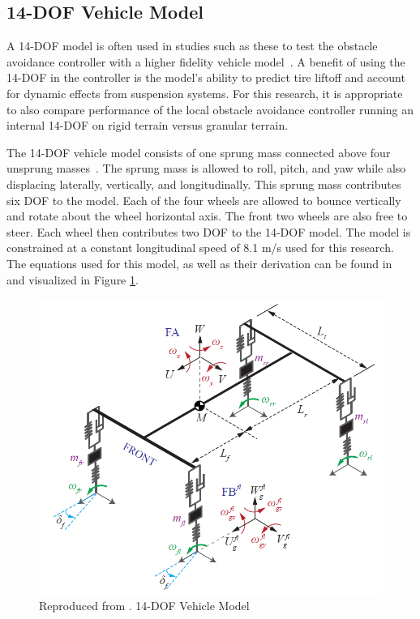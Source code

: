 \documentclass[12pt,onecolumn]{report}
\begin{document}

\subsection{14-DOF Vehicle Model}\label{ss:14DOFModel}
A 14-DOF model is often used in studies such as these to test the obstacle avoidance controller with a higher fidelity vehicle model~\cite{ModelFidelity2013, ModelFidelity2016}. A benefit of using the 14-DOF in the controller is the model's ability to predict tire liftoff and account for dynamic effects from suspension systems. For this research, it is appropriate to also compare performance of the local obstacle avoidance controller running an internal 14-DOF on rigid terrain versus granular terrain.  

The 14-DOF vehicle model consists of one sprung mass connected above four unsprung masses~\cite{RollStudies2007}. The sprung mass is allowed to roll, pitch, and yaw while also displacing laterally, vertically, and longitudinally. This sprung mass contributes six DOF to the model. Each of the four wheels are allowed to bounce vertically and rotate about the wheel horizontal axis. The front two wheels are also free to steer. Each wheel then contributes two DOF to the 14-DOF model. The model is constrained at a constant longitudinal speed of 8.1 m/s used for this research. The equations used for this model, as well as their derivation can be found in~\cite{RollStudies2007} and visualized in Figure \ref{fig:14DOF}.

\begin{figure}
	\centering
	\includegraphics[width=0.8\columnwidth]{Figs/14DOF_Stein.png}
	\caption{\small Reproduced from \protect\cite{RollStudies2007}. 14-DOF Vehicle Model}  
	\label{fig:14DOF}
\end{figure}
\end{document}
